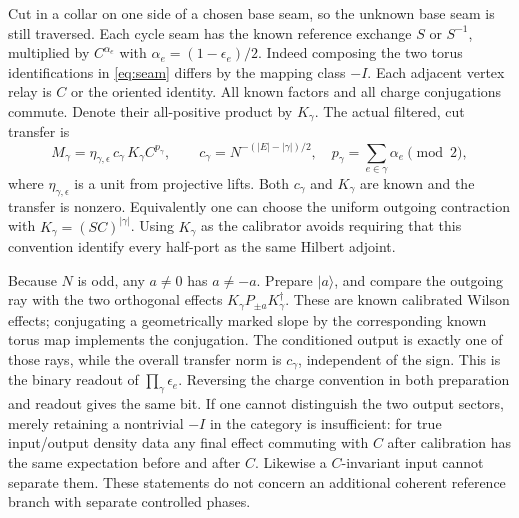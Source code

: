 \documentclass[11pt]{article}
\begin{document}
Cut in a collar on one side of a chosen base seam, so the unknown base seam is still traversed. Each cycle seam has the known reference exchange \(S\) or \(S^{-1}\), multiplied by \(C^{\alpha_e}\) with \(\alpha_e=(1-\epsilon_e)/2\). Indeed composing the two torus identifications in \eqref{eq:seam} differs by the mapping class \(-I\). Each adjacent vertex relay is \(C\) or the oriented identity. All known factors and all charge conjugations commute. Denote their all-positive product by \(K_\gamma\). The actual filtered, cut transfer is
\begin{equation}
 M_\gamma=\eta_{\gamma,\epsilon}\,c_\gamma\,K_\gamma C^{p_\gamma},
 \qquad c_\gamma=N^{-(|E|-|\gamma|)/2},\quad
 p_\gamma=\sum_{e\in\gamma}\alpha_e\pmod 2 ,
 \label{eq:transfer}
\end{equation}
where \(\eta_{\gamma,\epsilon}\) is a unit from projective lifts. Both \(c_\gamma\) and \(K_\gamma\) are known and the transfer is nonzero. Equivalently one can choose the uniform outgoing contraction with \(K_\gamma=(SC)^{|\gamma|}\). Using \(K_\gamma\) as the calibrator avoids requiring that this convention identify every half-port as the same Hilbert adjoint.

Because \(N\) is odd, any \(a\ne0\) has \(a\ne-a\). Prepare \(|a\rangle\), and compare the outgoing ray with the two orthogonal effects \(K_\gamma P_{\pm a}K_\gamma^\dagger\). These are known calibrated Wilson effects; conjugating a geometrically marked slope by the corresponding known torus map implements the conjugation. The conditioned output is exactly one of those rays, while the overall transfer norm is \(c_\gamma\), independent of the sign. This is the binary readout of \(\prod_\gamma\epsilon_e\). Reversing the charge convention in both preparation and readout gives the same bit. If one cannot distinguish the two output sectors, merely retaining a nontrivial \(-I\) in the category is insufficient: for true input/output density data any final effect commuting with \(C\) after calibration has the same expectation before and after \(C\). Likewise a \(C\)-invariant input cannot separate them. These statements do not concern an additional coherent reference branch with separate controlled phases.
\end{document}
